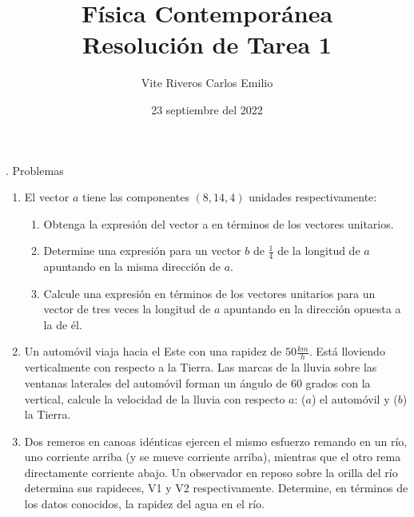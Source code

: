 \documentclass[11pt, a4paper]{article}
\title{Física Contemporánea\\Resolución de Tarea 1}
\author{Vite Riveros Carlos Emilio}
\date{23 septiembre del 2022}
\begin{document}
    . Problemas
    \begin{enumerate}
       \item El vector $a$ tiene las componentes $(8, 14, 4)$ unidades respectivamente:
       \begin{enumerate}
            \item Obtenga la expresión del vector a en términos de los vectores unitarios.
            \item Determine una expresión para un vector $b$ de $\frac{1}{4}$ de la longitud de $a$ 
            apuntando en la misma dirección de $a$.
            \item Calcule una expresión en términos de los vectores unitarios para un vector de
            tres veces la longitud de $a$ apuntando en la dirección opuesta a la de él.
       \end{enumerate}
       \item Un automóvil viaja hacia el Este con una rapidez de $50 \si{\frac{km}{h}}$. Está lloviendo
       verticalmente con respecto a la Tierra. Las marcas de la lluvia sobre las ventanas
       laterales del automóvil forman un ángulo de 60 grados con la vertical, calcule la
       velocidad de la lluvia con respecto $a$: ($a$) el automóvil y ($b$) la Tierra.
       \item Dos remeros en canoas idénticas ejercen el mismo esfuerzo remando en un río,
       uno corriente arriba (y se mueve corriente arriba), mientras que el otro rema
       directamente corriente abajo. Un observador en reposo sobre la orilla del río
       determina sus rapideces, V1 y V2 respectivamente. Determine, en términos de
       los datos conocidos, la rapidez del agua en el río.
    \end{enumerate}
\end{document}
